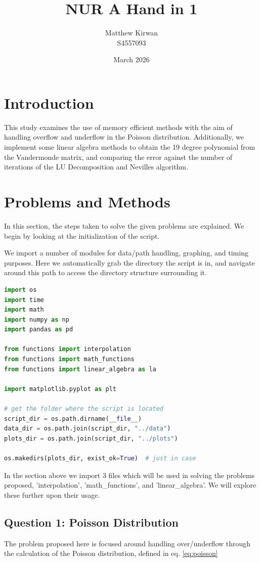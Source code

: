 \documentclass{article}
\title{NUR A Hand in 1}
\author{Matthew Kirwan \\
        S4557093}
\date{March 2026}
\begin{document}
\maketitle

\section*{Introduction}
This study examines the use of memory efficient methods with the aim of handling overflow and underflow in the Poisson distribution. Additionally, we implement some linear algebra methods to obtain the 19 degree polynomial from the Vandermonde matrix, and comparing the error against the number of iterations of the LU Decomposition and Nevilles algorithm.

\section*{Problems and Methods}
In this section, the steps taken to solve the given problems are explained. We begin by looking at the initialization of the script.

We import a number of modules for data/path handling, graphing, and timing purposes. Here we automatically grab the directory the script is in, and navigate around this path to access the directory structure surrounding it.

\begin{lstlisting}[language=Python]
import os
import time
import math
import numpy as np
import pandas as pd

from functions import interpolation
from functions import math_functions
from functions import linear_algebra as la

import matplotlib.pyplot as plt

# get the folder where the script is located
script_dir = os.path.dirname(__file__)
data_dir = os.path.join(script_dir, "../data")
plots_dir = os.path.join(script_dir, "../plots")

os.makedirs(plots_dir, exist_ok=True)  # just in case
\end{lstlisting}

In the section above we import 3 files which will be used in solving the problems proposed, 'interpolation', 'math\_functions', and 'linear\_algebra'. We will explore these further upon their usage.

\subsection*{Question 1: Poisson Distribution}
The problem proposed here is focused around handling over/underflow through the calculation of the Poisson distribution, defined in eq. \ref{eq:poisson}
\end{document}
